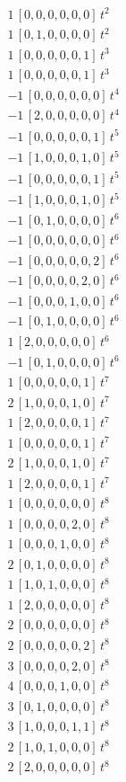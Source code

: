 \begin{align*}
1\,[0,0,0,0,0,0]\,t^{2} \\
1\,[0,1,0,0,0,0]\,t^{2} \\
1\,[0,0,0,0,0,1]\,t^{3} \\
1\,[0,0,0,0,0,1]\,t^{3} \\
-1\,[0,0,0,0,0,0]\,t^{4} \\
-1\,[2,0,0,0,0,0]\,t^{4} \\
-1\,[0,0,0,0,0,1]\,t^{5} \\
-1\,[1,0,0,0,1,0]\,t^{5} \\
-1\,[0,0,0,0,0,1]\,t^{5} \\
-1\,[1,0,0,0,1,0]\,t^{5} \\
-1\,[0,1,0,0,0,0]\,t^{6} \\
-1\,[0,0,0,0,0,0]\,t^{6} \\
-1\,[0,0,0,0,0,2]\,t^{6} \\
-1\,[0,0,0,0,2,0]\,t^{6} \\
-1\,[0,0,0,1,0,0]\,t^{6} \\
-1\,[0,1,0,0,0,0]\,t^{6} \\
1\,[2,0,0,0,0,0]\,t^{6} \\
-1\,[0,1,0,0,0,0]\,t^{6} \\
1\,[0,0,0,0,0,1]\,t^{7} \\
2\,[1,0,0,0,1,0]\,t^{7} \\
1\,[2,0,0,0,0,1]\,t^{7} \\
1\,[0,0,0,0,0,1]\,t^{7} \\
2\,[1,0,0,0,1,0]\,t^{7} \\
1\,[2,0,0,0,0,1]\,t^{7} \\
1\,[0,0,0,0,0,0]\,t^{8} \\
1\,[0,0,0,0,2,0]\,t^{8} \\
1\,[0,0,0,1,0,0]\,t^{8} \\
2\,[0,1,0,0,0,0]\,t^{8} \\
1\,[1,0,1,0,0,0]\,t^{8} \\
1\,[2,0,0,0,0,0]\,t^{8} \\
2\,[0,0,0,0,0,0]\,t^{8} \\
2\,[0,0,0,0,0,2]\,t^{8} \\
3\,[0,0,0,0,2,0]\,t^{8} \\
4\,[0,0,0,1,0,0]\,t^{8} \\
3\,[0,1,0,0,0,0]\,t^{8} \\
3\,[1,0,0,0,1,1]\,t^{8} \\
2\,[1,0,1,0,0,0]\,t^{8} \\
2\,[2,0,0,0,0,0]\,t^{8} \\

\end{align*}
